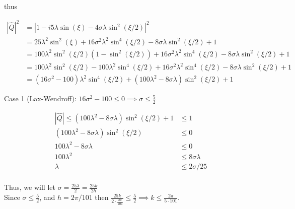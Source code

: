 \documentclass[11pt]{amsart}
\numberwithin{equation}{section}
\begin{document}
\begin{enumerate}
{          thus
          
          \begin{align}
              |\hat Q|^2 & = |1 - i5\lambda \sin(\xi) - 4\sigma \lambda \sin^2(\xi / 2)|^2                                                                            \\
                         & = 25 \lambda^2 \sin^2(\xi) + 16 \sigma^2 \lambda^2 \sin^4(\xi/2) - 8\sigma \lambda \sin^2(\xi / 2) + 1                                     \\
                         & = 100 \lambda^2 \sin^2(\xi /2) (1 - \sin^2(\xi/2)) + 16 \sigma^2 \lambda^2 \sin^4(\xi/2) - 8\sigma \lambda \sin^2(\xi / 2) + 1             \\
                         & = 100 \lambda^2 \sin^2(\xi /2) - 100 \lambda^2 \sin^4(\xi /2) + 16 \sigma^2 \lambda^2 \sin^4(\xi/2) - 8\sigma \lambda \sin^2(\xi / 2) + 1  \\
                         & = (16 \sigma^2 - 100)\lambda^2 \sin^4(\xi /2) + (100 \lambda^2 - 8\sigma \lambda) \sin^2(\xi / 2) + 1                                     
          \end{align}
          
          Case 1 (Lax-Wendroff): $16 \sigma^2 - 100 \le 0 \implies \sigma \le \frac{5}{2}$
          
          \begin{align}
              |\hat Q| \le (100 \lambda^2 - 8\sigma \lambda) \sin^2(\xi / 2) + 1 & \le 1               \\
              (100 \lambda^2 - 8\sigma \lambda) \sin^2(\xi / 2)                  & \le 0               \\
              100 \lambda^2 - 8\sigma \lambda                                    & \le 0               \\
              100 \lambda^2                                                      & \le 8\sigma \lambda \\
              \lambda                                                            & \le 2\sigma/25      \\
          \end{align}
          
          Thus, we will let $\sigma = \frac{25 \lambda}{2} = \frac{25 k}{2 h}$\\
          
          Since $\sigma \le \frac{5}{2}$, and $h = 2\pi / 101$ then $\frac{25 k}{2 \cdot \frac{2\pi}{101}} \le \frac{5}{2} \implies k \le \frac{2\pi}{5 \cdot 101}$.\\
          
}
\end{enumerate}
\end{document}
